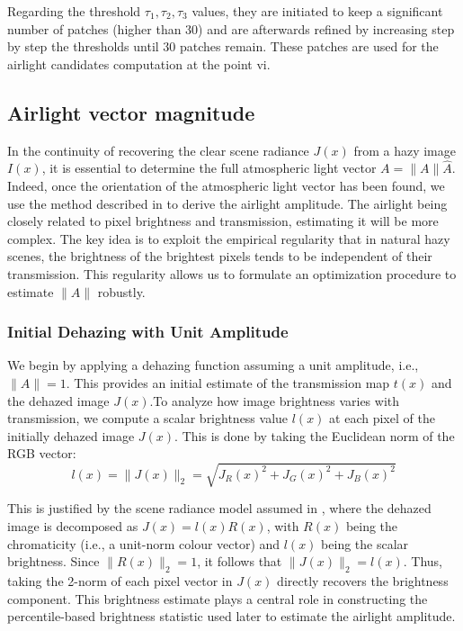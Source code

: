 \documentclass[conference]{IEEEtran}
\begin{document}
Regarding the threshold $\tau_1, \tau_2, \tau_3$ values, they are initiated to keep a significant number of patches (higher than 30) and are afterwards refined by increasing step
by step the thresholds until 30 patches remain. These patches are used for the airlight candidates computation at the point vi.

\subsection{Airlight vector magnitude}
\label{NimaPart}
In the continuity of recovering the clear scene radiance \( J(x) \) from a hazy image \( I(x) \), it is essential to determine the full atmospheric light vector \( A = \|A\|\hat{A} \). 
Indeed, once the orientation of the atmospheric light vector has been found, we use the method described in \cite{airlight} to derive the airlight amplitude. The airlight being closely related to pixel brightness and transmission, estimating it will be more complex. The key idea is to exploit the empirical regularity that in natural hazy scenes, the brightness of the brightest pixels tends to be independent of their transmission. This regularity allows us to formulate an optimization procedure to estimate \( \|A\| \) robustly.

\subsubsection{Initial Dehazing with Unit Amplitude}

We begin by applying a dehazing function assuming a unit amplitude, i.e., \( \|A\| = 1 \). This provides an initial estimate of the transmission map \( t(x) \) and the dehazed image \( J(x) \).To analyze how image brightness varies with transmission, we compute a scalar brightness value \( l(x) \) at each pixel of the initially dehazed image \( J(x) \). This is done by taking the Euclidean norm of the RGB vector:
\begin{equation}
\label{initial_brightness }
l(x) = \|J(x)\|_2 = \sqrt{J_R(x)^2 + J_G(x)^2 + J_B(x)^2}
\end{equation}

This is justified by the scene radiance model assumed in \cite{airlight}, where the dehazed image is decomposed as \( J(x) = l(x) R(x) \), with \( R(x) \) being the chromaticity (i.e., a unit-norm colour vector) and \( l(x) \) being the scalar brightness. Since \( \|R(x)\|_2 = 1 \), it follows that \( \|J(x)\|_2 = l(x) \). Thus, taking the 2-norm of each pixel vector in \( J(x) \) directly recovers the brightness component. This brightness estimate plays a central role in constructing the percentile-based brightness statistic used later to estimate the airlight amplitude.
\end{document}
